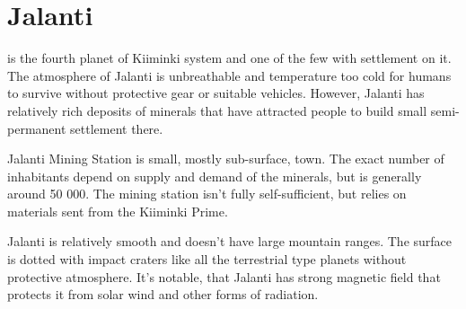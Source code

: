 \documentclass{tufte-book}
\begin{document}
\section{Jalanti}

 is the fourth planet of Kiiminki system and one of
the few with settlement on it. The atmosphere of Jalanti is unbreathable
and temperature too cold for humans to survive without protective gear
or suitable vehicles. However, Jalanti has relatively rich deposits of
minerals that have attracted people to build small semi-permanent
settlement there. 

Jalanti Mining Station is small, mostly sub-surface, town. The exact
number of inhabitants depend on supply and demand of the minerals, but
is generally around 50 000. The mining station isn't fully
self-sufficient, but relies on materials sent from the Kiiminki Prime.

Jalanti is relatively smooth and doesn't have large mountain ranges. The
surface is dotted with impact craters like all the terrestrial type planets
without protective atmosphere. It's notable, that Jalanti has strong magnetic
field that protects it from solar wind and other forms of radiation.
\end{document}
